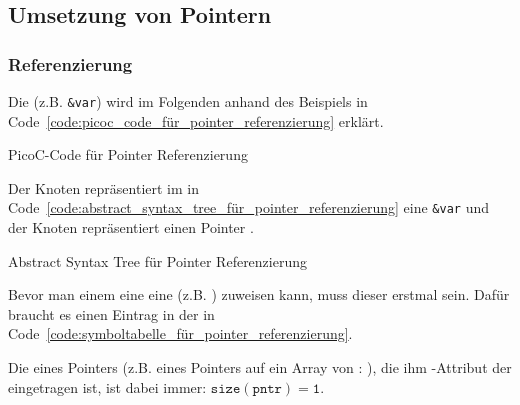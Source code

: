 
\subsection{Umsetzung von Pointern}
\label{sec:umsetzung_von_pointern}
\subsubsection{Referenzierung}
Die  (z.B. \verb|&var|) wird im Folgenden anhand des Beispiels in Code~\ref{code:picoc_code_für_pointer_referenzierung} erklärt.

\begin{code}
  \centering
  \caption{PicoC-Code für Pointer Referenzierung}
  \label{code:picoc_code_für_pointer_referenzierung}
\end{code}

Der Knoten  repräsentiert im  in Code~\ref{code:abstract_syntax_tree_für_pointer_referenzierung} eine  \verb|&var| und der Knoten  repräsentiert einen Pointer .

\begin{code}
  \centering
  \caption{Abstract Syntax Tree für Pointer Referenzierung}
  \label{code:abstract_syntax_tree_für_pointer_referenzierung}
\end{code}

Bevor man einem  eine eine  (z.B. ) zuweisen kann, muss dieser erstmal  sein. Dafür braucht es einen Eintrag in der  in Code~\ref{code:symboltabelle_für_pointer_referenzierung}.

\begin{Special_Paragraph}
Die  eines Pointers (z.B. eines Pointers auf ein Array von : ), die ihm -Attribut der  eingetragen ist, ist dabei immer: $\mathtt{size(pntr) = 1}$.
\end{Special_Paragraph}

